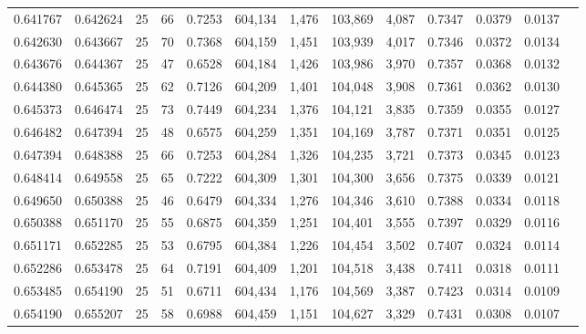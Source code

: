 \begin{tabular}{rrrrrrrrrrrrr}
0.641767 & 0.642624 &    25 &  66 &                                     0.7253 & 604,134 &   1,476 & 103,869 &   4,087 & 0.7347 & 0.0379 & 0.0137 \\
0.642630 & 0.643667 &    25 &  70 &                                     0.7368 & 604,159 &   1,451 & 103,939 &   4,017 & 0.7346 & 0.0372 & 0.0134 \\
0.643676 & 0.644367 &    25 &  47 &                                     0.6528 & 604,184 &   1,426 & 103,986 &   3,970 & 0.7357 & 0.0368 & 0.0132 \\
0.644380 & 0.645365 &    25 &  62 &                                     0.7126 & 604,209 &   1,401 & 104,048 &   3,908 & 0.7361 & 0.0362 & 0.0130 \\
0.645373 & 0.646474 &    25 &  73 &                                     0.7449 & 604,234 &   1,376 & 104,121 &   3,835 & 0.7359 & 0.0355 & 0.0127 \\
0.646482 & 0.647394 &    25 &  48 &                                     0.6575 & 604,259 &   1,351 & 104,169 &   3,787 & 0.7371 & 0.0351 & 0.0125 \\
0.647394 & 0.648388 &    25 &  66 &                                     0.7253 & 604,284 &   1,326 & 104,235 &   3,721 & 0.7373 & 0.0345 & 0.0123 \\
0.648414 & 0.649558 &    25 &  65 &                                     0.7222 & 604,309 &   1,301 & 104,300 &   3,656 & 0.7375 & 0.0339 & 0.0121 \\
0.649650 & 0.650388 &    25 &  46 &                                     0.6479 & 604,334 &   1,276 & 104,346 &   3,610 & 0.7388 & 0.0334 & 0.0118 \\
0.650388 & 0.651170 &    25 &  55 &                                     0.6875 & 604,359 &   1,251 & 104,401 &   3,555 & 0.7397 & 0.0329 & 0.0116 \\
0.651171 & 0.652285 &    25 &  53 &                                     0.6795 & 604,384 &   1,226 & 104,454 &   3,502 & 0.7407 & 0.0324 & 0.0114 \\
0.652286 & 0.653478 &    25 &  64 &                                     0.7191 & 604,409 &   1,201 & 104,518 &   3,438 & 0.7411 & 0.0318 & 0.0111 \\
0.653485 & 0.654190 &    25 &  51 &                                     0.6711 & 604,434 &   1,176 & 104,569 &   3,387 & 0.7423 & 0.0314 & 0.0109 \\
0.654190 & 0.655207 &    25 &  58 &                                     0.6988 & 604,459 &   1,151 & 104,627 &   3,329 & 0.7431 & 0.0308 & 0.0107 \\

\end{tabular}
